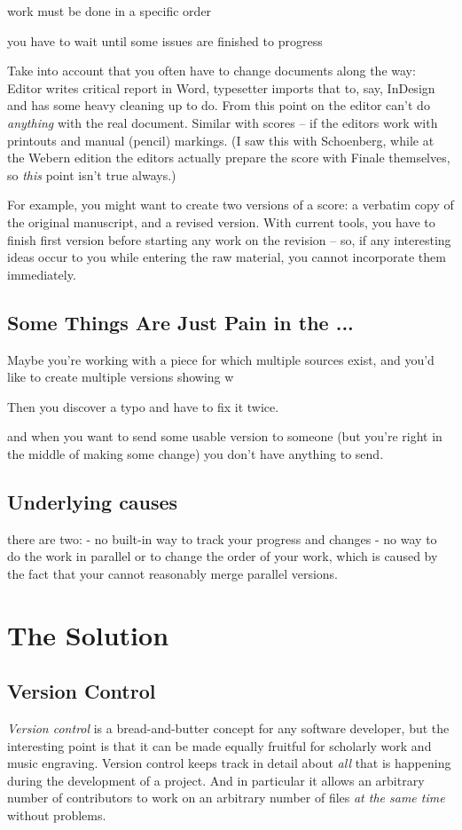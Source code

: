 \documentclass[11pt,a4paper]{article}
\begin{document}
work must be done in a specific order

you have to wait until some issues are finished to progress

Take into account that you often have to change documents along the way:
Editor writes critical report in Word, typesetter imports that to, say, InDesign
and has some heavy cleaning up to do. From this point on the editor can't do
\emph{anything} with the real document. Similar with scores -- if the editors work
with printouts and manual (pencil) markings. (I saw this with Schoenberg, while at
the Webern edition the editors actually prepare the score with Finale themselves,
so \emph{this} point isn't true always.)

For example, you might want to create two versions of a score:
a verbatim copy of the original manuscript, and a revised version.
With current tools, you have to finish first version before starting
any work on the revision -- so, if any interesting ideas occur to you
while entering the raw material, you cannot incorporate them immediately.

\subsection{Some Things Are Just Pain in the ...}
Maybe you're working with a piece for which multiple sources exist,
and you'd like to create multiple versions showing w

Then you discover a typo and have to fix it twice.


and when you want to send some usable version to someone
(but you're right in the middle of making some change)
you don't have anything to send.

\subsection{Underlying causes}
there are two:
- no built-in way to track your progress and changes
- no way to do the work in parallel or to change the order of your work, 
which is caused by the fact that your cannot reasonably merge parallel versions.


\section{The Solution}

\subsection{Version Control}
\emph{Version control} is a bread-and-butter concept for any software developer, but the
interesting point is that it can be made equally fruitful for scholarly work and music
engraving. Version control keeps track in detail about \emph{all} that is happening during
the development of a project. And in particular it allows an arbitrary number of contributors
to work on an arbitrary number of files \emph{at the same time} without problems.
\end{document}
